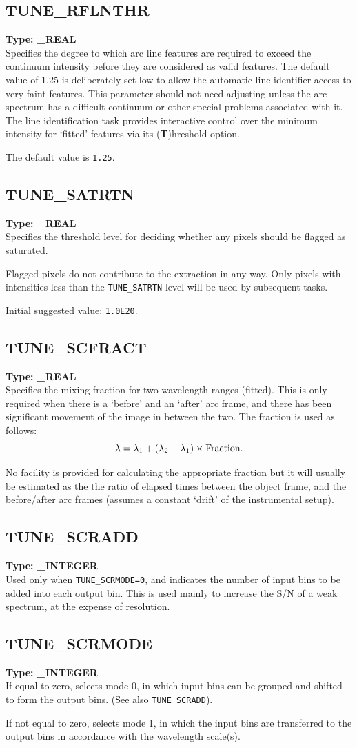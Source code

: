 \documentclass[11pt,twoside]{article}
\makeatletter
\newcommand{\htmlref}[2]{#1}
\newcommand{\xlabel}[1]{}
\newcommand{\indexcmdname}[1]{\index{#1@\protect\cmdname{#1}}}
\renewcommand{\indexcmdname}[1]{}
\newcommand{\cmdname}{\begingroup \catcode`\_=12 \realcmdname}
\newcommand{\realcmdname}[1]{\endgroup\texttt{#1}}
\newcommand{\echparameter}[4]
{
\item [#1 = #3] \mbox{}\label{par_#2}\indexcmdname{#2}
\\
#4
}
\renewcommand{\echparameter}[4]
{
  \subsection{\xlabel{par_#2}\label{par_#2}{\bf #1}}
  {\bf Type: #3}\\
#4
}
\makeatother
\begin{document}
\echparameter{TUNE\_RFLNTHR}{TUNE_RFLNTHR}{
 \_REAL
}{
 Specifies the degree to which arc line features are required to
 exceed the continuum intensity before they are considered as valid
 features. The default value of 1.25 is deliberately set low to
 allow the automatic line identifier access to very faint features.
 This parameter should not need adjusting unless the arc spectrum
 has a difficult continuum or other special problems associated with
 it.  The line identification task provides interactive control over
 the minimum intensity for `fitted' features via its ({\bf{T}})hreshold
 option.

 The default value is \texttt{1.25}.
}

\echparameter{TUNE\_SATRTN}{TUNE_SATRTN}{
 \_REAL
}{
 Specifies the threshold level for deciding whether any pixels
 should be flagged as saturated.

 Flagged pixels do not contribute to the extraction in any way.
 Only pixels with intensities less than the {\tt TUNE\_SATRTN} level will
 be used by subsequent tasks.

 Initial suggested value: \texttt{1.0E20}.
}

\echparameter{TUNE\_SCFRACT}{TUNE_SCFRACT}{
 \_REAL
}{
 Specifies the mixing fraction for two wavelength ranges (fitted).
 This is only required when there is a `before' and an `after' arc
 frame, and there has been significant movement of the image in
 between the two.  The fraction is used as follows:
 \[ \lambda = \lambda_{1} + (\lambda_{2} - \lambda_{1}) \times {\rm Fraction}.\]

 No facility is provided for calculating the appropriate fraction
 but it will usually be estimated as the the ratio of elapsed times
 between the object frame, and the before/after arc frames (assumes
 a constant `drift' of the instrumental setup).
}

\echparameter{TUNE\_SCRADD}{TUNE_SCRADD}{
 \_INTEGER
}{
 Used only when \htmlref{{\tt TUNE\_SCRMODE=0}}{par_TUNE_SCRMODE},
 and indicates the number of input
 bins to be added into each output bin.  This is used mainly to
 increase the S/N of a weak spectrum, at the expense of resolution.
}

\echparameter{TUNE\_SCRMODE}{TUNE_SCRMODE}{
 \_INTEGER
}{
 If equal to zero, selects mode 0, in which input bins can be
 grouped and shifted to form the output bins.
 (See also \htmlref{{\tt TUNE\_SCRADD}}{par_TUNE_SCRADD}).

 If not equal to zero, selects mode 1, in which the input bins are
 transferred to the output bins in accordance with the wavelength
 scale(s).
}
\end{document}
